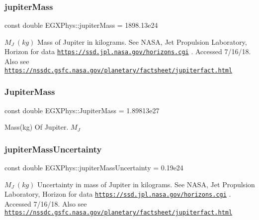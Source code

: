 \subsubsection{\texorpdfstring{jupiter\+Mass}{jupiterMass}}
{\footnotesize\ttfamily const double E\+G\+X\+Phys\+::jupiter\+Mass = 1898.\+13e24}

$M_{J} \ (kg)$ Mass of Jupiter in kilograms. See N\+A\+SA, Jet Propulsion Laboratory, Horizon for data \href{https://ssd.jpl.nasa.gov/horizons.cgi}{\tt https\+://ssd.\+jpl.\+nasa.\+gov/horizons.\+cgi} . Accessed 7/16/18. Also see \href{https://nssdc.gsfc.nasa.gov/planetary/factsheet/jupiterfact.html}{\tt https\+://nssdc.\+gsfc.\+nasa.\+gov/planetary/factsheet/jupiterfact.\+html} \mbox{\label{namespace_e_g_x_phys_ad790be322eb318e95b4ea609b4954da9}} 
\subsubsection{\texorpdfstring{Jupiter\+Mass}{JupiterMass}}
{\footnotesize\ttfamily const double E\+G\+X\+Phys\+::\+Jupiter\+Mass = 1.\+89813e27}

Mass(kg) Of Jupiter. $M_J$ \mbox{\label{namespace_e_g_x_phys_ab16070b1d99b54cfb6f2f9ee9250fb14}} 
\subsubsection{\texorpdfstring{jupiter\+Mass\+Uncertainty}{jupiterMassUncertainty}}
{\footnotesize\ttfamily const double E\+G\+X\+Phys\+::jupiter\+Mass\+Uncertainty = 0.\+19e24}

$M_{J} \ (kg)$ Uncertainty in mass of Jupiter in kilograms. See N\+A\+SA, Jet Propulsion Laboratory, Horizon for data \href{https://ssd.jpl.nasa.gov/horizons.cgi}{\tt https\+://ssd.\+jpl.\+nasa.\+gov/horizons.\+cgi} . Accessed 7/16/18. Also see \href{https://nssdc.gsfc.nasa.gov/planetary/factsheet/jupiterfact.html}{\tt https\+://nssdc.\+gsfc.\+nasa.\+gov/planetary/factsheet/jupiterfact.\+html} \mbox{\label{namespace_e_g_x_phys_ade1d97dbbb33f1c2345c24ebea67e21f}} 
